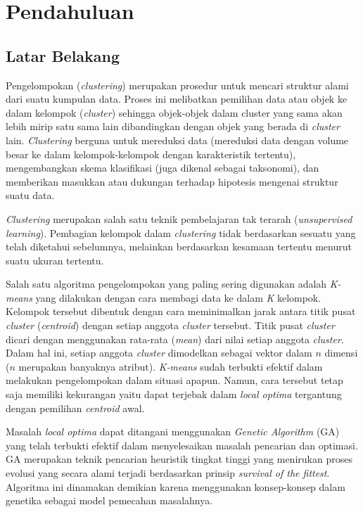 \chapter{Pendahuluan}
\label{chap:intro}
   
\section{Latar Belakang}
\label{sec:label}

Pengelompokan (\textit{clustering}) merupakan prosedur untuk mencari struktur alami dari suatu kumpulan data. Proses ini melibatkan pemilihan data atau objek ke dalam kelompok (\textit{cluster}) sehingga objek-objek dalam cluster yang sama akan lebih mirip satu sama lain dibandingkan dengan objek yang berada di \textit{cluster} lain. \textit{Clustering} berguna untuk mereduksi data (mereduksi data dengan volume besar ke dalam kelompok-kelompok dengan karakteristik tertentu), mengembangkan skema klasifikasi (juga dikenal sebagai taksonomi), dan memberikan masukkan atau dukungan terhadap hipotesis mengenai struktur suatu data.

\textit{Clustering} merupakan salah satu teknik pembelajaran tak terarah (\textit{unsupervised learning}). Pembagian kelompok dalam \textit{clustering} tidak berdasarkan sesuatu yang telah diketahui sebelumnya, melainkan berdasarkan kesamaan tertentu menurut suatu ukuran tertentu\cite{raposo2014automatic}.

Salah satu algoritma pengelompokan yang paling sering digunakan adalah \textit{K-means} yang dilakukan dengan cara membagi data ke dalam \textit{K} kelompok. Kelompok tersebut dibentuk dengan cara meminimalkan jarak antara titik pusat \textit{cluster} (\textit{centroid}) dengan setiap anggota \textit{cluster} tersebut. Titik pusat \textit{cluster} dicari dengan menggunakan rata-rata (\textit{mean}) dari nilai setiap anggota \textit{cluster}. Dalam hal ini, setiap anggota \textit{cluster} dimodelkan sebagai vektor dalam $n$ dimensi ($n$ merupakan banyaknya atribut). \textit{K-means} sudah terbukti efektif dalam melakukan pengelompokan  dalam situasi apapun. Namun, cara tersebut tetap saja memiliki kekurangan yaitu dapat terjebak dalam \textit{local optima} tergantung dengan pemilihan \textit{centroid} awal.\cite{maulik2000genetic}

Masalah \textit{local optima} dapat ditangani menggunakan \textit{Genetic Algorithm} (GA) yang telah terbukti efektif dalam menyelesaikan masalah pencarian dan optimasi. GA merupakan teknik pencarian heuristik tingkat tinggi yang menirukan proses evolusi yang secara alami terjadi\cite{holland1992genetic} berdasarkan prinsip \textit{survival of the fittest}. Algoritma ini dinamakan demikian karena menggunakan konsep-konsep dalam genetika sebagai model pemecahan masalahnya. \cite{sivanandam2007introduction}

